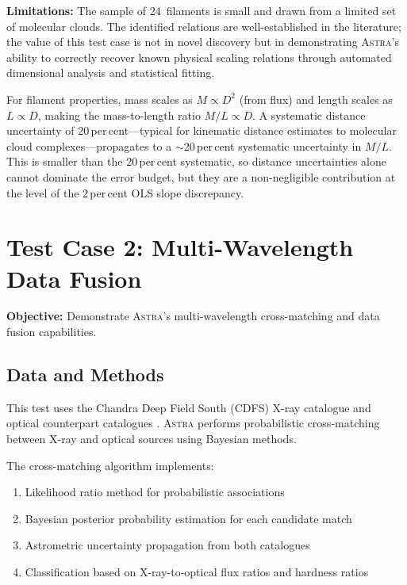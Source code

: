 \documentclass[usenatbib]{rasti}
\newcommand{\astra}{\textsc{Astra}\xspace}
\begin{document}
\textbf{Limitations:} The sample of 24~filaments is small and drawn from a limited set of molecular clouds.
The identified relations are well-established in the literature; the value of this test case is not in novel discovery but in demonstrating \astra's ability to correctly recover known physical scaling relations through automated dimensional analysis and statistical fitting.

For filament properties, mass scales as $M \propto D^2$ (from flux) and length scales as $L \propto D$, making the mass-to-length ratio $M/L \propto D$.
A systematic distance uncertainty of 20\,per\,cent---typical for kinematic distance estimates to molecular cloud complexes---propagates to a $\sim$20\,per\,cent systematic uncertainty in $M/L$.
This is smaller than the 20\,per\,cent systematic, so distance uncertainties alone cannot dominate the error budget, but they are a non-negligible contribution at the level of the 2\,per\,cent OLS slope discrepancy.

\section{Test Case 2: Multi-Wavelength Data Fusion}
\label{sec:tc2}

\textbf{Objective:} Demonstrate \astra's multi-wavelength cross-matching and data fusion capabilities.

\subsection{Data and Methods}
\label{sec:tc2:data}

This test uses the Chandra Deep Field South (CDFS) X-ray catalogue \citep{Giacconi2001} and optical counterpart catalogues \citep{Alexander2003,Bauer2004}.
\astra performs probabilistic cross-matching between X-ray and optical sources using Bayesian methods.

The cross-matching algorithm implements:
\begin{enumerate}
  \item[(i)] Likelihood ratio method \citep{SutherlandSaunders1992} for probabilistic associations
  \item[(ii)] Bayesian posterior probability estimation for each candidate match
  \item[(iii)] Astrometric uncertainty propagation from both catalogues
  \item[(iv)] Classification based on X-ray-to-optical flux ratios and hardness ratios
\end{enumerate}
\end{document}
